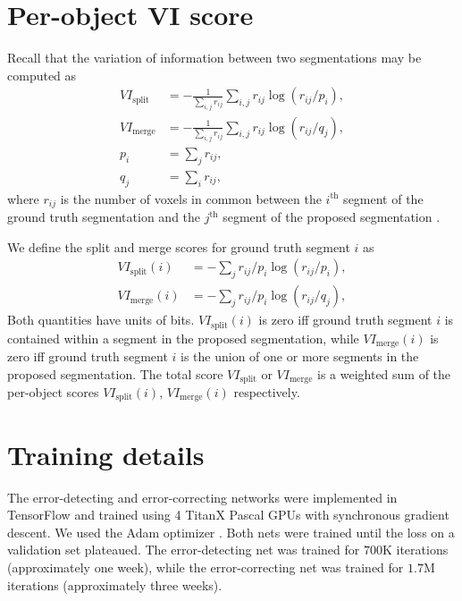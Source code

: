 \documentclass{article}
\begin{document}
\begin{appendices}
\section{Per-object VI score}
\label{appendix:vi}
 Recall that the variation of information between two segmentations may be computed as
\begin{align*}
	VI_\text{split}&=-\frac 1 {\sum_{i,j} r_{ij}} \sum_{i,j} r_{ij} \log(r_{ij}/p_i),\\
	VI_\text{merge}&=-\frac 1 {\sum_{i,j} r_{ij}} \sum_{i,j} r_{ij} \log(r_{ij}/q_j),\\
	p_i&=\sum_j r_{ij},\\
	q_j&=\sum_i r_{ij},
\end{align*}
where $r_{ij}$ is the number of voxels in common between the $i^\text{th}$ segment of the ground truth segmentation and the $j^\text{th}$ segment of the proposed segmentation \cite{vi}.

We define the split and merge scores for ground truth segment $i$ as
\begin{align*}
	VI_\text{split}(i) &= -\sum_j r_{ij}/p_i \log(r_{ij}/p_i),\\
	VI_\text{merge}(i) &= -\sum_j r_{ij}/p_i \log(r_{ij}/q_j),
\end{align*}
Both quantities have units of bits. $VI_\text{split}(i)$ is zero iff ground truth segment $i$ is contained within a segment in the proposed segmentation, while $VI_\text{merge}(i)$ is zero iff ground truth segment $i$ is the union of one or more segments in the proposed segmentation. The total score $VI_\text{split}$ or $VI_\text{merge}$ is a weighted sum of the per-object scores $VI_\text{split}(i)$, $VI_\text{merge}(i)$ respectively.


\section{Training details}
The error-detecting and error-correcting networks were implemented in TensorFlow \cite{tensorflow} and trained using 4 TitanX Pascal GPUs with synchronous gradient descent. We used the Adam optimizer \cite{adam}.   Both nets were trained until the loss on a validation set plateaued. The error-detecting net was trained for $700$K iterations (approximately one week), while the error-correcting net was trained for $1.7$M iterations (approximately three weeks).

\end{appendices}


\end{document}
